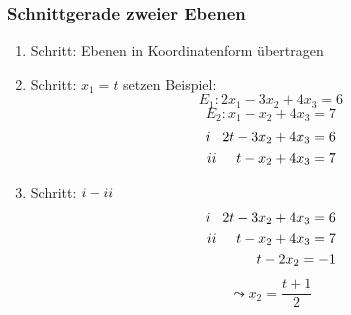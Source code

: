 \documentclass[a4paper, 15pt]{article}
\newcommand{\uproman}[1]{\uppercase\expandafter{\romannumeral#1}}
\begin{document}
\subsubsection{Schnittgerade zweier Ebenen}
\begin{minipage}{.49\textwidth}
\begin{enumerate}
\item Schritt: Ebenen in Koordinatenform übertragen
\item Schritt: $x_1 = t$ setzen\newline
Beispiel:
\begin{equation*}
E_1: 2x_1 - 3x_2 + 4x_3 = 6
\end{equation*}
\begin{equation*}
E_2: x_1 - x_2 + 4x_3 = 7
\end{equation*}
\begin{align*}
\uproman{1}\hspace{.3cm} 2t - 3x_2 + 4x_3 = 6 \\
\uproman{2}\hspace{.5cm} t - x_2 + 4x_3 = 7
\end{align*}
\item Schritt: $\uproman{1}-\uproman{2}$\newline
\begin{align*}
\uproman{1}\hspace{.3cm} 2t - 3x_2 + 4x_3 = 6 \\
\uproman{2}\hspace{.5cm} t - x_2 + 4x_3 = 7 \\
t - 2x_2 = -1
\end{align*}
\begin{equation*}
\leadsto x_2 = \dfrac{t+1}{2}
\end{equation*}
\end{enumerate}
\end{minipage}
\end{document}

